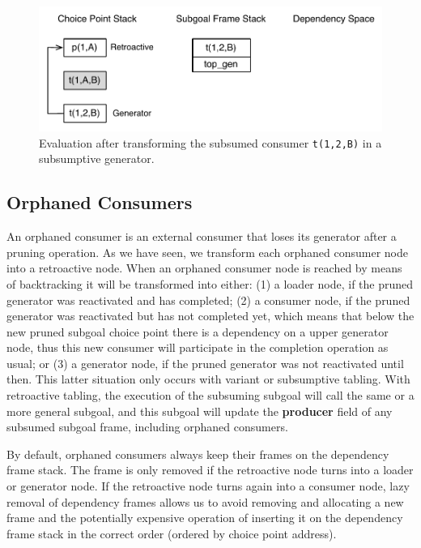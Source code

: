 \begin{figure}[ht]
  \centering
    \includegraphics[scale=0.5]{retro_sub4.pdf}
  \caption{Evaluation after transforming the subsumed consumer \texttt{t(1,2,B)} in a subsumptive generator.}
  \label{fig:retro_sub4}
\end{figure}

\subsection{Orphaned Consumers}

An orphaned consumer is an external consumer that loses its generator after a pruning operation.
As we have seen, we transform each orphaned consumer node into a retroactive node.
When an orphaned consumer node is reached by means of backtracking it will be transformed into either:
(1) a loader node, if the pruned generator was reactivated and has completed; (2) a consumer node,
if the pruned generator was reactivated but has not completed yet, which means that below the new pruned subgoal
choice point there is a dependency on a upper generator node, thus this new consumer will participate
in the completion operation as usual; or (3) a generator node,
if the pruned generator was not reactivated until then. This latter situation only occurs with
variant or subsumptive tabling. With retroactive tabling, the execution of the subsuming subgoal
will call the same or a more general subgoal, and this subgoal will update the \textbf{producer} field
of any subsumed subgoal frame, including orphaned consumers.

By default, orphaned consumers always keep their frames on the dependency frame stack. The frame is only
removed if the retroactive node turns into a loader or generator node. If the retroactive node turns again
into a consumer node, lazy removal of dependency frames allows us to avoid removing and allocating a new
frame and the potentially expensive operation of inserting it on the dependency frame stack in the
correct order (ordered by choice point address).

